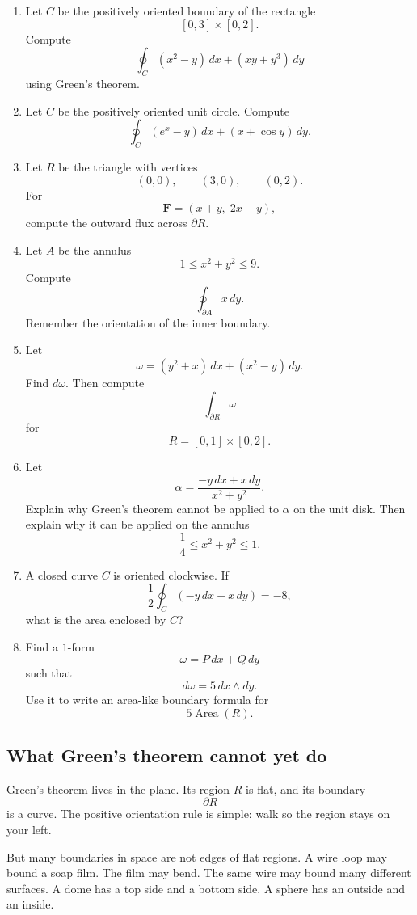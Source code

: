 \begin{enumerate}
\item Let \(C\) be the positively oriented boundary of the rectangle
\[
    [0,3]\times[0,2].
\]
Compute
\[
    \oint_C (x^2-y)\,dx+(xy+y^3)\,dy
\]
using Green's theorem.

\item Let \(C\) be the positively oriented unit circle.  Compute
\[
    \oint_C (e^x-y)\,dx+(x+\cos y)\,dy.
\]

\item Let \(R\) be the triangle with vertices
\[
    (0,0),\qquad (3,0),\qquad (0,2).
\]
For
\[
    \mathbf F=(x+y,\;2x-y),
\]
compute the outward flux across \(\partial R\).

\item Let \(A\) be the annulus
\[
    1\le x^2+y^2\le9.
\]
Compute
\[
    \oint_{\partial A}x\,dy.
\]
Remember the orientation of the inner boundary.

\item Let
\[
    \omega=(y^2+x)\,dx+(x^2-y)\,dy.
\]
Find \(d\omega\).  Then compute
\[
    \int_{\partial R}\omega
\]
for
\[
    R=[0,1]\times[0,2].
\]

\item Let
\[
    \alpha=\frac{-y\,dx+x\,dy}{x^2+y^2}.
\]
Explain why Green's theorem cannot be applied to \(\alpha\) on the unit disk.  Then
explain why it can be applied on the annulus
\[
    \frac14\le x^2+y^2\le1.
\]

\item A closed curve \(C\) is oriented clockwise.  If
\[
    \frac12\oint_C(-y\,dx+x\,dy)=-8,
\]
what is the area enclosed by \(C\)?

\item Find a \(1\)-form
\[
    \omega=P\,dx+Q\,dy
\]
such that
\[
    d\omega=5\,dx\wedge dy.
\]
Use it to write an area-like boundary formula for
\[
    5\operatorname{Area}(R).
\]
\end{enumerate}

\subsection{What Green's theorem cannot yet do}

Green's theorem lives in the plane.  Its region \(R\) is flat, and its boundary
\[
    \partial R
\]
is a curve.  The positive orientation rule is simple: walk so the region stays on your
left.

But many boundaries in space are not edges of flat regions.  A wire loop may bound a
soap film.  The film may bend.  The same wire may bound many different surfaces.
A dome has a top side and a bottom side.  A sphere has an outside and an inside.

